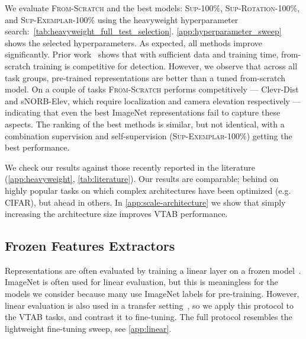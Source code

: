 We evaluate \textsc{From-Scratch} and the best models: \textsc{Sup-100\%}, \textsc{Sup-Rotation-100\%}, and \textsc{Sup-Exemplar-100\%} using the heavyweight hyperparameter search:~\ref{tab:heavyweight_full_test_selection}.
\ref{app:hyperparameter_sweep} shows the selected hyperparameters. As expected, all methods improve significantly. Prior work~\citep{he2018rethinking} shows that with sufficient data and training time, from-scratch training is competitive for detection. However, we observe that across all task groups, pre-trained representations are better than a tuned from-scratch model. On a couple of tasks \textsc{From-Scratch} performs competitively --- Clevr-Dist and sNORB-Elev, which require localization and camera elevation respectively --- indicating that even the best ImageNet representations fail to capture these aspects. The ranking of the best methods is similar, but not identical, with a combination supervision and self-supervision (\textsc{Sup-Exemplar-100\%}) getting the best performance.

We check our results against those recently reported in the literature (\ref{app:heavyweight}, \ref{tab:literature}).
Our results are comparable; behind on highly popular tasks on which complex architectures have been optimized (e.g. CIFAR), but ahead in others. In \ref{app:scale-architecture} we show that simply increasing the architecture size improves VTAB performance.

\subsection{Frozen Features Extractors\label{sec:linear}}

Representations are often evaluated by training a linear layer on a frozen model~\citep{kolesnikov2019revisiting}. ImageNet is often used for linear evaluation, but this is meaningless for the models we consider because many use ImageNet labels for pre-training. However, linear evaluation is also used in a transfer setting~\citep{goyal2019scaling}, so we apply this protocol to the VTAB tasks, and contrast it to fine-tuning. The full protocol resembles the lightweight fine-tuning sweep, see \ref{app:linear}.

